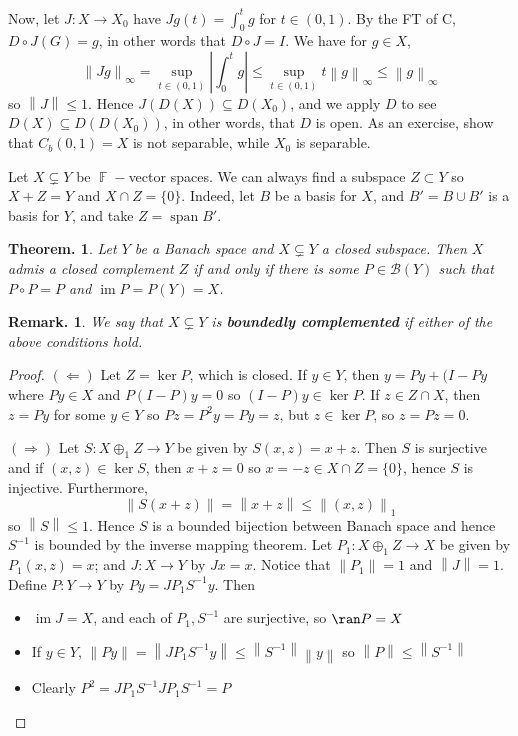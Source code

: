\documentclass[11pt, a4paper]{memoir}
\DeclareMathOperator{\F}{{\mathbb{F}}}
\newcommand{\norm}[1]{\ensuremath{\left\lVert#1\right\rVert}}
\theoremstyle{change}
\newtheorem{theorem}{Theorem.}[section]
\theoremstyle{plain}
\theoremstyle{nonumberplain}
\newtheorem{remark}{Remark.}
\newtheorem{proof}{Proof}
\DeclareMathOperator{\im}{im}
\DeclareMathOperator{\spn}{span}
\numberwithin{equation}{section}
\begin{document}
\begin{enumerate}[nl,r]
        Now, let $J:X\to X_0$ have $Jg(t)=\int_0^t g$ for $t\in(0,1)$.
        By the FT of C, $D\circ J(G)=g$, in other words that $D\circ J=I$.
        We have for $g\in X$,
        \begin{equation*}
            \norm{Jg}_\infty=\sup_{t\in(0,1)}|\int_0^tg|\leq\sup_{t\in(0,1)}t\norm{g}_\infty\leq\norm{g}_\infty
        \end{equation*}
        so $\norm{J}\leq 1$.
        Hence $J(D(X))\subseteq D(X_0)$, and we apply $D$ to see $D(X)\subseteq D(D(X_0))$, in other words, that $D$ is open.
        As an exercise, show that $C_b(0,1)=X$ is not separable, while $X_0$ is separable.
\end{enumerate}
Let $X\subsetneq Y$ be $\F-$vector spaces.
We can always find a subspace $Z\subset Y$ so $X+Z=Y$ and $X\cap Z=\{0\}$.
Indeed, let $B$ be a basis for $X$, and $B'=B\cup B'$ is a basis for $Y$, and take $Z=\spn B'$.
\begin{theorem}
    Let $Y$ be a Banach space and $X\subsetneq Y$ a closed subspace.
    Then $X$ admis a closed complement $Z$ if and only if there is some $P\in\mathcal{B}(Y)$ such that $P\circ P=P$ and $\im P=P(Y)=X$.
\end{theorem}
\begin{remark}
    We say that $X\subsetneq Y$ is \textbf{boundedly complemented} if either of the above conditions hold.
\end{remark}
\begin{proof}
    $(\Leftarrow)$ Let $Z=\ker P$, which is closed.
    If $y\in Y$, then $y=Py+(I-Py$ where $Py\in X$ and $P(I-P)y=0$ so $(I-P)y\in\ker P$.
    If $z\in Z\cap X$, then $z=Py$ for some $y\in Y$ so $Pz=P^2y=Py=z$, but $z\in\ker P$, so $z=Pz=0$.

    $(\Rightarrow)$ Let $S:X\oplus_1 Z\to Y$ be given by $S(x,z)=x+z$.
    Then $S$ is surjective and if $(x,z)\in\ker S$, then $x+z=0$ so $x=-z\in X\cap Z=\{0\}$, hence $S$ is injective.
    Furthermore,
    \begin{equation*}
        \norm{S(x+z)}=\norm{x+z}\leq\norm{(x,z)}_1
    \end{equation*}
    so $\norm{S}\leq 1$.
    Hence $S$ is a bounded bijection between Banach space and hence $S^{-1}$ is bounded by the inverse mapping theorem.
    Let $P_1:X\oplus_1 Z\to X$ be given by $P_1(x,z)=x$; and $J:X\to Y$ by $Jx=x$.
    Notice that $\norm{P_1}=1$ and $\norm{J}=1$.
    Define $P:Y\to Y$ by $Py=JP_1S^{-1}y$.
    Then
    \begin{itemize}[nl]
        \item $\im J=X$, and each of $P_1,S^{-1}$ are surjective, so $\ran P=X$
        \item If $y\in Y$, $\norm{Py}=\norm{JP_1S^{-1}y}\leq\norm{S^{-1}}\norm{y}$ so $\norm{P}\leq\norm{S^{-1}}$
        \item Clearly $P^2=JP_1S^{-1}JP_1S^{-1}=P$
    \end{itemize}
\end{proof}
\end{document}
